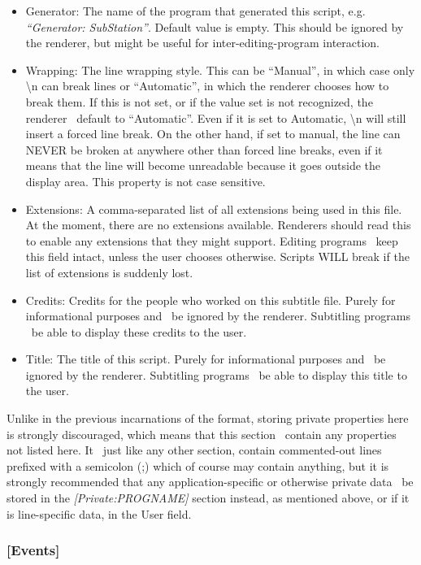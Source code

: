 \documentclass{spec}
\begin{document}
\begin{itemize}
\item Generator: The name of the program that generated this script, e.g. \textit{``Generator: SubStation''}.
Default value is empty. This should be ignored by the renderer, but might be useful for inter-editing-program
interaction.
\item Wrapping: The line wrapping style. This can be ``Manual'', in which case only \textbackslash{n} can
break lines or ``Automatic'', in which the renderer chooses how to break them. If this is not set, or if the
value set is not recognized, the renderer \must\ default to ``Automatic''.
Even if it is set to Automatic, \textbackslash{n} will still insert a forced line break.
On the other hand, if set to manual, the line can NEVER be broken at anywhere other than forced line breaks,
even if it means that the line will become unreadable because it goes outside the display area.
This property is not case sensitive.
\item Extensions: A comma-separated list of all extensions being used in this file. At the moment, there are
no extensions available. Renderers should read this to enable any extensions that they might support.
Editing programs \must\ keep this field intact, unless the user chooses otherwise. Scripts WILL break
if the list of extensions is suddenly lost.
\item Credits: Credits for the people who worked on this subtitle file. Purely for informational purposes and
\should\ be ignored by the renderer. Subtitling programs \should\ be able to display these credits to the user.
\item Title: The title of this script. Purely for informational purposes and \should\ be ignored by the renderer.
Subtitling programs \should\ be able to display this title to the user.
\end{itemize}

Unlike in the previous incarnations of the format, storing private properties here is strongly discouraged,
which means that this section \shouldnot\ contain any properties not listed here. It \may\, just like any other
section, contain commented-out lines prefixed with a semicolon (;) which of course may contain anything, but it
is strongly recommended that any application-specific or otherwise private data \should\ be stored in the
\textit{[Private:PROGNAME]} section instead, as mentioned above, or if it is line-specific data, in the User field.


\subsubsection{[Events]}
\end{document}
